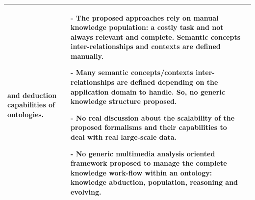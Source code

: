 \begin{table}
\begin{tabular}{p{4.7cm}  p{4.7cm}p{4.7cm}}
\begin{flushleft}
					and deduction capabilities of ontologies.\end{flushleft}
				& \begin{flushleft}
					- The proposed approaches rely on manual knowledge population: 
					a costly task and not always relevant and complete. Semantic 
					concepts inter-relationships and contexts are defined manually.\par
					- Many semantic concepts/contexts inter-relationships are defined 
					depending on the application domain to handle. So, no generic 
					knowledge structure \revAnglais{was} proposed.\par
					- No real discussion about the scalability of the proposed formalisms
					and their capabilities to deal with real large-scale data. \par
					- No generic multimedia analysis oriented framework proposed to manage 
					the complete knowledge work-flow within an ontology: knowledge abduction, 
					population, reasoning and evolving.
				\end{flushleft}\\
				\hline
			\end{tabular}
			\label{review1}
		\end{table}

